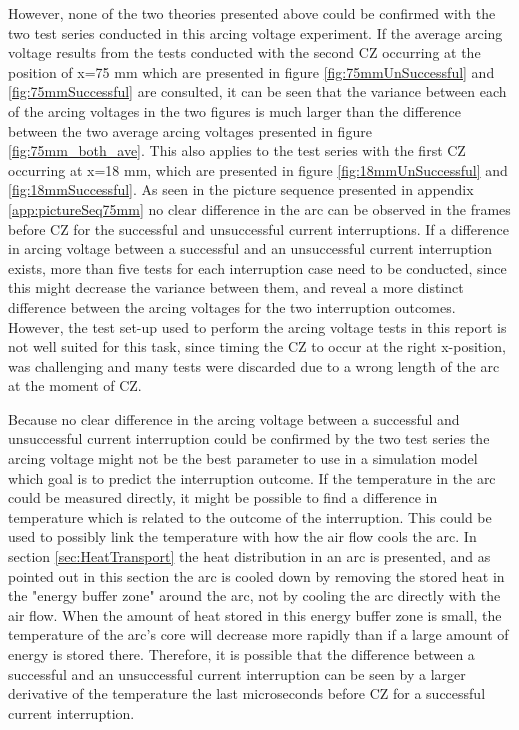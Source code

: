 \documentclass[10pt,b5paper,twoside]{article}
\begin{document}
However, none of the two theories presented above could be confirmed with the two test series conducted in this arcing voltage experiment. If the average arcing voltage results from the tests conducted with the second CZ occurring at the position of x=75 mm which are presented in figure \ref{fig:75mmUnSuccessful} and \ref{fig:75mmSuccessful} are consulted, it can be seen that the variance between each of the arcing voltages in the two figures is much larger than the difference between the two average arcing voltages presented in figure \ref{fig:75mm_both_ave}. This also applies to the test series with the first CZ occurring at x=18 mm, which are presented in figure \ref{fig:18mmUnSuccessful} and \ref{fig:18mmSuccessful}. As seen in the picture sequence presented in appendix \ref{app:pictureSeq75mm} no clear difference in the arc can be observed in the frames before CZ for the successful and unsuccessful current interruptions. If a difference in arcing voltage between a successful and an unsuccessful current interruption exists, more than five tests for each interruption case need to be conducted, since this might decrease the variance between them, and reveal a more distinct difference between the arcing voltages for the two interruption outcomes. However, the test set-up used to perform the arcing voltage tests in this report is not well suited for this task, since timing the CZ to occur at the right x-position, was challenging and many tests were discarded due to a wrong length of the arc at the moment of CZ.

Because no clear difference in the arcing voltage between a successful and unsuccessful current interruption could be confirmed by the two test series the arcing voltage might not be the best parameter to use in a simulation model which goal is to predict the interruption outcome. If the temperature in the arc could be measured directly, it might be possible to find a difference in temperature which is related to the outcome of the interruption. This could be used to possibly link the temperature with how the air flow cools the arc. In section \ref{sec:HeatTransport} the heat distribution in an arc is presented, and as pointed out in this section the arc is cooled down by removing the stored heat in the "energy buffer zone" around the arc, not by cooling the arc directly with the air flow. When the amount of heat stored in this energy buffer zone is small, the temperature of the arc's core will decrease more rapidly than if a large amount of energy is stored there. Therefore, it is possible that the difference between a successful and an unsuccessful current interruption can be seen by a larger derivative of the temperature the last microseconds before CZ for a successful current interruption.
\end{document}
